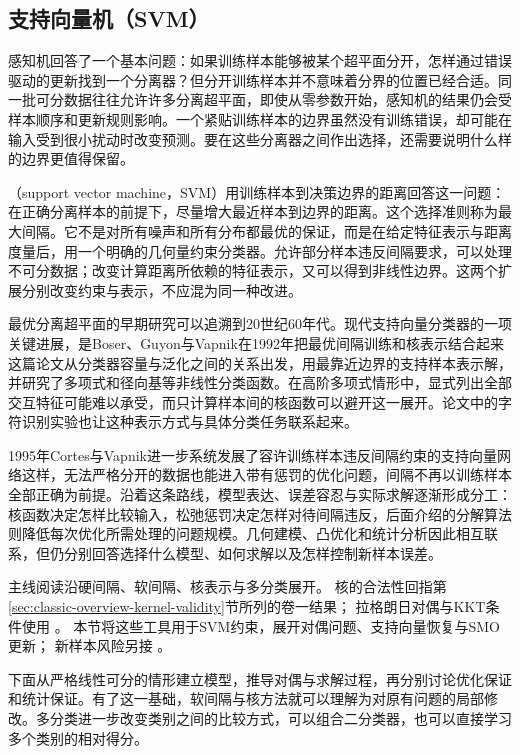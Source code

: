 \subsection{支持向量机（SVM）}
\label{sec:classification-svm}

感知机回答了一个基本问题：如果训练样本能够被某个超平面分开，怎样通过错误驱动的更新找到一个分离器？但分开训练样本并不意味着分界的位置已经合适。同一批可分数据往往允许许多分离超平面，即使从零参数开始，感知机的结果仍会受样本顺序和更新规则影响。一个紧贴训练样本的边界虽然没有训练错误，却可能在输入受到很小扰动时改变预测。要在这些分离器之间作出选择，还需要说明什么样的边界更值得保留。

（support vector machine，SVM）用训练样本到决策边界的距离回答这一问题：在正确分离样本的前提下，尽量增大最近样本到边界的距离。这个选择准则称为最大间隔。它不是对所有噪声和所有分布都最优的保证，而是在给定特征表示与距离度量后，用一个明确的几何量约束分类器。允许部分样本违反间隔要求，可以处理不可分数据；改变计算距离所依赖的特征表示，又可以得到非线性边界。这两个扩展分别改变约束与表示，不应混为同一种改进。

最优分离超平面的早期研究可以追溯到20世纪60年代。现代支持向量分类器的一项关键进展，是Boser、Guyon与Vapnik在1992年把最优间隔训练和核表示结合起来这篇论文从分类器容量与泛化之间的关系出发，用最靠近边界的支持样本表示解，并研究了多项式和径向基等非线性分类函数。在高阶多项式情形中，显式列出全部交互特征可能难以承受，而只计算样本间的核函数可以避开这一展开。论文中的字符识别实验也让这种表示方式与具体分类任务联系起来。

1995年Cortes与Vapnik进一步系统发展了容许训练样本违反间隔约束的支持向量网络这样，无法严格分开的数据也能进入带有惩罚的优化问题，间隔不再以训练样本全部正确为前提。沿着这条路线，模型表达、误差容忍与实际求解逐渐形成分工：核函数决定怎样比较输入，松弛惩罚决定怎样对待间隔违反，后面介绍的分解算法则降低每次优化所需处理的问题规模。几何建模、凸优化和统计分析因此相互联系，但仍分别回答选择什么模型、如何求解以及怎样控制新样本误差。

主线阅读沿硬间隔、软间隔、核表示与多分类展开。
核的合法性回指第\ref{sec:classic-overview-kernel-validity}节所列的卷一结果；
拉格朗日对偶与KKT条件使用
。
本节将这些工具用于SVM约束，展开对偶问题、支持向量恢复与SMO更新；
新样本风险另接
。

下面从严格线性可分的情形建立模型，推导对偶与求解过程，再分别讨论优化保证和统计保证。有了这一基础，软间隔与核方法就可以理解为对原有问题的局部修改。多分类进一步改变类别之间的比较方式，可以组合二分类器，也可以直接学习多个类别的相对得分。

